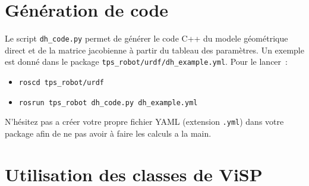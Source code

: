 \documentclass[12pt,a4paper]{article}
\begin{document}
\section{Génération de code}
\label{sec:DH}

Le script \texttt{dh\_code.py} permet de générer le code C++ du modele géométrique direct et de la matrice jacobienne à partir du tableau des paramètres. Un exemple est donné dans le package \texttt{tps\_robot/urdf/dh\_example.yml}. Pour le lancer~:
\begin{itemize}
\item \texttt{roscd tps\_robot/urdf}
\item \texttt{rosrun tps\_robot dh\_code.py dh\_example.yml}
\end{itemize}
N'hésitez pas a créer votre propre fichier YAML (extension \texttt{.yml}) dans votre package afin de ne pas avoir à faire les calculs a la main. 


\section{Utilisation des classes de ViSP}
\label{sec:visp}
\end{document}
